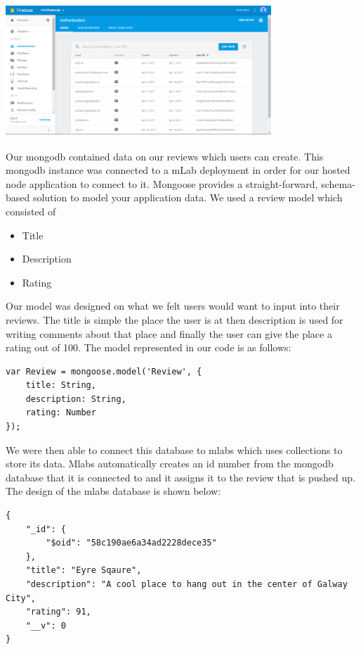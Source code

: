 \begin{center}    
	\includegraphics[width=10cm, height=5cm]{img/ionic2login.png}
\end{center}

Our mongodb contained data on our reviews which users can create. This mongodb instance was connected to a mLab deployment in order for our hosted node application to connect to it. Mongoose provides
a straight-forward, schema-based solution to model your application data. We used a review model which consisted of 

\begin{itemize}
	\item Title
	\item Description
	\item Rating
\end{itemize}

Our model was designed on what we felt users would want to input into their reviews. The title is simple the place the user is at then description is used for writing comments about that place and finally the user can give the place a rating out of 100.
The model represented in our code is as follows:

\begin{verbatim}
var Review = mongoose.model('Review', {
	title: String,
	description: String,
	rating: Number
});
\end{verbatim}

We were then able to connect this database to mlabs which uses collections to store its data. Mlabs automatically creates an id number from the mongodb database that it is connected to and it assigns it to the review that is pushed up. The design of the mlabs database is shown below: 
\begin{verbatim}
{
	"_id": {
		"$oid": "58c190ae6a34ad2228dece35"
	},
	"title": "Eyre Sqaure",
	"description": "A cool place to hang out in the center of Galway City",
	"rating": 91,
	"__v": 0
}

\end{verbatim}

